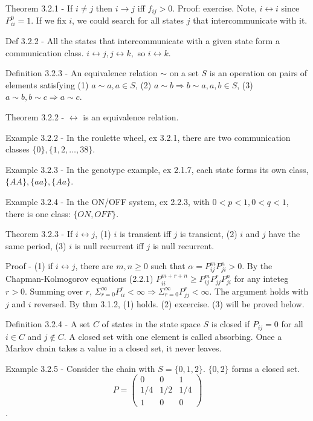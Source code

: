\documentclass{article}
\begin{document}
Theorem 3.2.1 - If $i \ne j$ then $i \rightarrow j$ iff $f_{ij} > 0$. Proof: exercise. Note, $i \leftrightarrow i$ since $P_{ii}^0 = 1$. If we fix $i$, we could search for all states $j$ that intercommunicate with it.

Def 3.2.2 - All the states that intercommunicate with a given state form a communication class. $i \leftrightarrow j, j \leftrightarrow k,$ so $i \leftrightarrow k$.

Definition 3.2.3 - An equivalence relation $\sim$ on a set $S$ is an operation on pairs of elements satisfying (1) $a \sim a, a \in S$, (2) $a \sim b \Rightarrow b \sim a, a, b \in S$, (3) $a \sim b, b \sim c \Rightarrow a \sim c$.

Theorem 3.2.2 - $\leftrightarrow$ is an equivalence relation.

Example 3.2.2 - In the roulette wheel, ex 3.2.1, there are two communication classes $\{0\}, \{1, 2, \dots, 38\}$.

Example 3.2.3 - In the genotype example, ex 2.1.7, each state forms its own class, $\{AA\}, \{aa\}, \{Aa\}$.

Example 3.2.4 - In the ON/OFF system, ex 2.2.3, with $0 < p < 1, 0 < q < 1$, there is one class: $\{ON, OFF\}$.

Theorem 3.2.3 - If $i \leftrightarrow j$, (1) $i$ is transient iff $j$ is transient, (2) $i$ and $j$ have the same period, (3) $i$ is null recurrent iff $j$ is null recurrent.

Proof - (1) if $i \leftrightarrow j$, there are $m, n \ge 0$ such that $\alpha = P_{ij}^m P_{ji}^n > 0$. By the Chapman-Kolmogorov equations (2.2.1) $P_{ii}^{m+r+n} \ge P_{ij}^m P_{jj}^r P_{ji}^n$ for any inteteg $r > 0$. Summing over $r$, $\Sigma_{r=0}^\infty P_{ii}^r < \infty \Rightarrow \Sigma_{r=0}^\infty P_{jj}^r < \infty$. The argument holds with $j$ and $i$ reversed. By thm 3.1.2, (1) holds. (2) excercise. (3) will be proved below.

Definition 3.2.4 - A set $C$ of states in the state space $S$ is closed if $P_{ij} = 0$ for all $i \in C$ and $j \not \in C$. A closed set with one element is called absorbing. Once a Markov chain takes a value in a closed set, it never leaves.

Example 3.2.5 - Consider the chain with $S = \{0, 1, 2\}$. $\{0, 2\}$ forms a closed set. \begin{displaymath} P = \left( \begin{array}{ccc} 0 & 0 & 1 \\ 1/4 & 1/2 & 1/4 \\ 1 & 0 & 0 \end{array} \right) \end{displaymath}.
\end{document}
